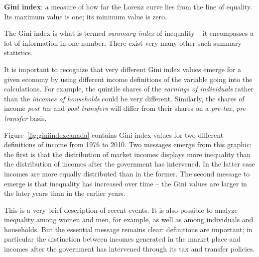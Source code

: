 \begin{DefBox}
\textbf{Gini index}: a measure of how far the Lorenz curve lies from the line of equality. Its maximum value is one; its minimum value is zero.
\end{DefBox}

The Gini index is what is termed \textit{summary index} of inequality -- it encompasses a lot of information in one number. There exist very many other such summary statistics.

It is important to recognize that very different Gini index values emerge for a given economy by using different income definitions of the variable going into the calculations. For example, the quintile shares of the \textit{earnings of individuals} rather than the \textit{incomes of households} could be very different.  Similarly, the shares of income \textit{post tax} and \textit{post transfers} will differ from their shares on a \textit{pre-tax}, \textit{pre-transfer} basis.

Figure~\ref{fig:giniindexcanada} contains Gini index values for two different definitions of income from 1976 to 2010. Two messages emerge from this graphic: the first is that the distribution of market incomes displays more inequality than the distribution of incomes after the government has intervened. In the latter case incomes are more equally distributed than in the former. The second message to emerge is that inequality has increased over time -- the Gini values are larger in the later years than in the earlier years.



This is a very brief description of recent events. It is also possible to analyze inequality among women and men, for example, as well as among individuals and households. But the essential message remains clear: definitions are important; in particular the distinction between incomes generated in the market place and incomes after the government has intervened through its tax and transfer policies.

